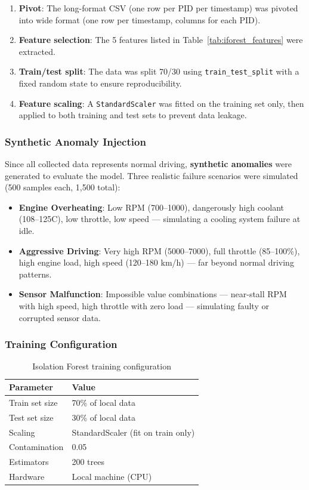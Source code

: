 \begin{enumerate}
    \item \textbf{Pivot}: The long-format CSV (one row per PID per timestamp) was pivoted into wide format (one row per timestamp, columns for each PID).
    \item \textbf{Feature selection}: The 5 features listed in Table~\ref{tab:iforest_features} were extracted.
    \item \textbf{Train/test split}: The data was split 70/30 using \texttt{train\_test\_split} with a fixed random state to ensure reproducibility.
    \item \textbf{Feature scaling}: A \texttt{StandardScaler} was fitted on the training set only, then applied to both training and test sets to prevent data leakage.
\end{enumerate}

\subsubsection{Synthetic Anomaly Injection}

Since all collected data represents normal driving, \textbf{synthetic anomalies} were generated to evaluate the model. Three realistic failure scenarios were simulated (500 samples each, 1,500 total):

\begin{itemize}
    \item \textbf{Engine Overheating}: Low RPM (700--1000), dangerously high coolant (108--125\textdegree C), low throttle, low speed --- simulating a cooling system failure at idle.
    \item \textbf{Aggressive Driving}: Very high RPM (5000--7000), full throttle (85--100\%), high engine load, high speed (120--180 km/h) --- far beyond normal driving patterns.
    \item \textbf{Sensor Malfunction}: Impossible value combinations --- near-stall RPM with high speed, high throttle with zero load --- simulating faulty or corrupted sensor data.
\end{itemize}

\subsubsection{Training Configuration}

\begin{table}[h]
\centering
\begin{tabular}{|l|l|}
\hline
\textbf{Parameter} & \textbf{Value} \\
\hline
Train set size & 70\% of local data \\
\hline
Test set size & 30\% of local data \\
\hline
Scaling & StandardScaler (fit on train only) \\
\hline
Contamination & 0.05 \\
\hline
Estimators & 200 trees \\
\hline
Hardware & Local machine (CPU) \\
\hline
\end{tabular}
\caption{Isolation Forest training configuration}
\label{tab:iforest_training}
\end{table}

